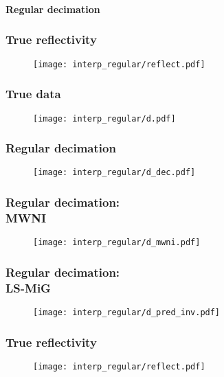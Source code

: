 \begin{frame} \frametitle{ }
	\begin{center}
        \LARGE {\bf Regular decimation}
	\end{center}
\end{frame}

\begin{frame}
\frametitle{True reflectivity\\}
\begin{figure} 
\texttt{[image: interp\_regular/reflect.pdf]} \\
\end{figure} 
\end{frame}

\begin{frame}
\frametitle{True data\\}
\begin{figure} 
\texttt{[image: interp\_regular/d.pdf]} \\
\end{figure} 
\end{frame}

\begin{frame}
\frametitle{Regular decimation\\}
\begin{figure} 
\texttt{[image: interp\_regular/d\_dec.pdf]} \\
\end{figure} 
\end{frame}

\begin{frame}
\frametitle{Regular decimation:\\MWNI}
\begin{figure} 
\texttt{[image: interp\_regular/d\_mwni.pdf]} \\
\end{figure} 
\end{frame}

\begin{frame}
\frametitle{Regular decimation:\\LS-MiG}
\begin{figure} 
\texttt{[image: interp\_regular/d\_pred\_inv.pdf]} \\
\end{figure} 
\end{frame}

\begin{frame}
\frametitle{True reflectivity\\ }
\begin{figure} 
\texttt{[image: interp\_regular/reflect.pdf]} \\
\end{figure} 
\end{frame}

